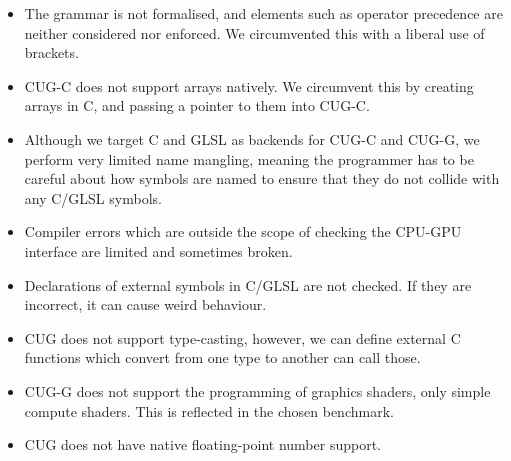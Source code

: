 \documentclass[a4paper,12pt,twoside,openright]{report}
\begin{document}
\begin{itemize}

    \item The grammar is not formalised, and elements such as operator
    precedence are neither considered nor enforced. We circumvented this with a
    liberal use of brackets.

    \item CUG-C does not support arrays natively. We circumvent this by
    creating arrays in C, and passing a pointer to them into CUG-C.

    \item Although we target C and GLSL as backends for CUG-C and CUG-G, we
    perform very limited name mangling, meaning the programmer has to be
    careful about how symbols are named to ensure that they do not collide with
    any C/GLSL symbols.

    \item Compiler errors which are outside the scope of checking the CPU-GPU
    interface are limited and sometimes broken.

    \item Declarations of external symbols in C/GLSL are not checked. If they are
    incorrect, it can cause weird behaviour.

    \item CUG does not support type-casting, however, we can define external C
    functions which convert from one type to another can call those.

    \item CUG-G does not support the programming of graphics shaders, only
    simple compute shaders. This is reflected in the chosen benchmark.

    \item CUG does not have native floating-point number support.

\end{itemize}




\end{document}
